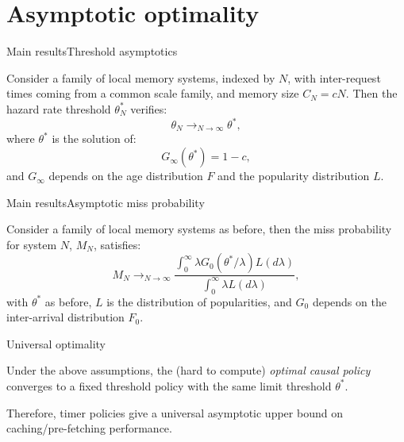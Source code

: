 \documentclass[aspectratio=169]{beamer}
\begin{document}
\section{Asymptotic optimality}

\begin{frame}{Main results}{Threshold asymptotics}

\begin{theorem}\label{thm:main_thm}
	Consider a family of local memory systems, indexed by $N$, with inter-request times coming from a common scale family, and memory size $C_N = cN$. Then the hazard rate threshold $\theta_N^*$ verifies:
	\begin{equation*}
	  \theta_N \mathop{\longrightarrow}_{N\to\infty} \theta^*,
	\end{equation*}
	where $\theta^*$ is the solution of:
	\begin{equation*}\label{eq:asymptotic_threshold}
		G_\infty(\theta^*) = 1-c, 
	\end{equation*}
	and $G_\infty$ depends on the age distribution $F$ and the popularity distribution $L$.
\end{theorem}
	  
\end{frame}

\begin{frame}{Main results}{Asymptotic miss probability}
	\begin{theorem}
		Consider a family of local memory systems as before, then the miss probability for system $N$, $M_N$, satisfies:
	\begin{equation*}
	  M_N \mathop{\longrightarrow}_{N\to\infty}\frac{\displaystyle \int_0^{\infty}\lambda G_0(\theta^*/\lambda) L(d\lambda)}{\displaystyle \int_0^\infty \lambda L(d\lambda)},
	\end{equation*}
	with $\theta^*$ as before, $L$ is the distribution of popularities, and $G_0$ depends on the inter-arrival distribution $F_0$. 
  \end{theorem}

\end{frame}

\begin{frame}{Universal optimality}

	\begin{theorem}
		Under the above assumptions, the (hard to compute) \emph{optimal causal policy} converges to a \alert{fixed threshold policy} with the same limit  threshold $\theta^*$.
	\end{theorem}
	
	\vfill
	
	Therefore, timer policies give a \alert{universal asymptotic upper bound} on caching/pre-fetching performance.
\end{frame}
\end{document}
